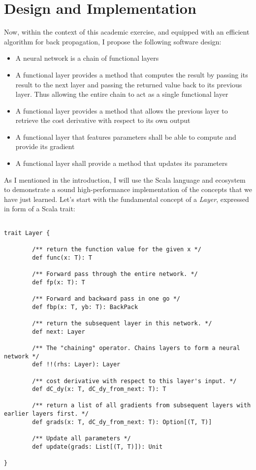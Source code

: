 \documentclass[]{report}
\begin{document}
\section{Design and Implementation}

Now, within the context of this academic exercise, and equipped with an efficient algorithm for back propagation, I propose the following software design:

\begin{itemize}
	\item A neural network is a chain of functional layers
	\item A functional layer provides a method that computes the result by passing its result to the next layer and passing the returned value back to its previous layer. Thus allowing the entire chain to act as a single functional layer
	\item A functional layer provides a method that allows the previous layer to retrieve the cost derivative with respect to its own output
	\item A functional layer that features parameters shall be able to compute and provide its gradient 
	\item A functional layer shall provide a method that updates its parameters
\end{itemize}

As I mentioned in the introduction, I will use the Scala language and ecosystem to demonstrate a sound high-performance implementation of the concepts that we have just learned. Let's start with the fundamental concept of a \emph{Layer}, expressed in form of a Scala trait:

\begin{lstlisting}[label=vectors_in_scala,caption=The functional layer interface] 

trait Layer {

		/** return the function value for the given x */
		def func(x: T): T
		
		/** Forward pass through the entire network. */
		def fp(x: T): T
		
		/** Forward and backward pass in one go */
		def fbp(x: T, yb: T): BackPack
		
		/** return the subsequent layer in this network. */
		def next: Layer
		
		/** The "chaining" operator. Chains layers to form a neural network */
		def !!(rhs: Layer): Layer
		
		/** cost derivative with respect to this layer's input. */
		def dC_dy(x: T, dC_dy_from_next: T): T
		
		/** return a list of all gradients from subsequent layers with earlier layers first. */
		def grads(x: T, dC_dy_from_next: T): Option[(T, T)]
		
		/** Update all parameters */
		def update(grads: List[(T, T)]): Unit
		
}

\end{lstlisting}
\end{document}
